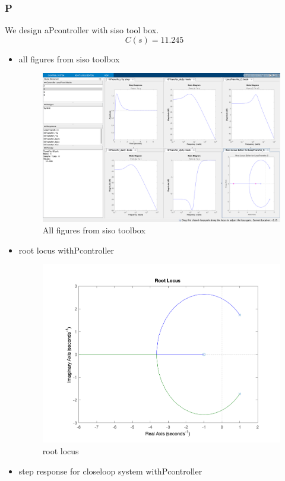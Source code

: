 \subsubsection{P}
We design aPcontroller with siso tool box.
$$
C(s) = 11.245
$$
\begin{itemize}
	\item all figures from siso toolbox
	\begin{figure}[H]
		\caption{All figures from siso toolbox}
		\centering
		\includegraphics[width=16cm]{../Figure/Q1/Q1_b/P/siso_all.png}
	\end{figure}
	\newpage
	\item root locus withPcontroller
	\begin{figure}[H]
		\caption{root locus}
		\centering
		\includegraphics[width=12cm]{../Figure/Q1/Q1_b/P/rlocus.png}
	\end{figure}
	\item step response for closeloop system withPcontroller

\end{itemize}
